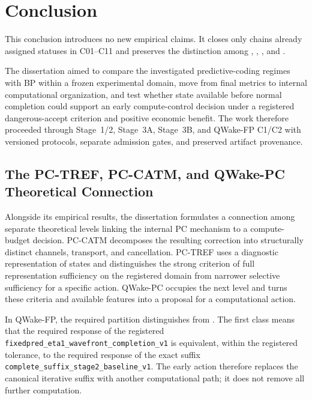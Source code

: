 \chapter{Conclusion}
\label{ch:conclusion-en}

This conclusion introduces no new empirical claims. It closes only chains already
assigned statuses in C01--C11 and preserves the distinction among
, , , and
.

The dissertation aimed to compare the investigated predictive-coding regimes with BP
within a frozen experimental domain, move from final metrics to internal computational
organization, and test whether state available before normal completion could support
an early compute-control decision under a registered dangerous-accept criterion and
positive economic benefit. The work therefore proceeded through Stage~1/2, Stage~3A,
Stage~3B, and QWake-FP C1/C2 with versioned protocols, separate admission gates, and
preserved artifact provenance.

\section{The PC-TREF, PC-CATM, and QWake-PC Theoretical Connection}

Alongside its empirical results, the dissertation formulates a connection among
separate theoretical levels linking the internal PC mechanism to a compute-budget
decision. PC-CATM decomposes the resulting correction into structurally distinct
channels, transport, and cancellation. PC-TREF uses a diagnostic representation of
states and distinguishes the strong criterion of full representation sufficiency on
the registered domain from narrower selective sufficiency for a specific action.
QWake-PC occupies the next level and turns these criteria and available features into
a proposal for a computational action.

In QWake-FP, the required partition distinguishes  from
. The first class means that the required response of the
registered 
\nolinkurl{fixedpred_eta1_wavefront_completion_v1} is equivalent, within the
registered tolerance, to the required response of the exact suffix
\nolinkurl{complete_suffix_stage2_baseline_v1}. The early action therefore replaces
the canonical iterative suffix with another computational path; it does not remove all
further computation.

